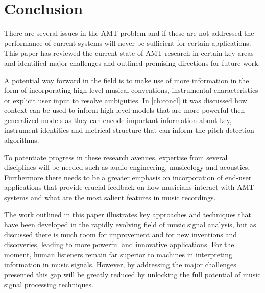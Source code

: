 \section{Conclusion}
There are several issues in the \ac{AMT} problem and if these are not addressed the
performance of current systems will never be sufficient for certain
applications. This paper has reviewed the current state of \ac{AMT} research in
certain key areas and identified major challenges and outlined promising
directions for future work.

A potential way forward in the field is to make use of more information in the
form of incorporating high-level musical conventions, instrumental
characteristics or explicit user input to resolve ambiguties. In
\autoref{ch:concl} it was discussed how context can be used to inform high-level models
that are more powerful then generalized models as they can encode important
information about key, instrument identities and metrical structure that can
inform the pitch detection algorithms.

To potentiate progress in these research avenues, expertise from several
disciplines will be needed such as audio engineering, musicology and acoustics.
Furthermore there needs to be a greater emphasis on incorporation of end-user
applications that provide crucial feedback on how musicians interact with \ac{AMT}
systems and what are the most salient features in music recordings.

The work outlined in this paper illustrates key approaches and techniques that
have been developed in the rapidly evolving field of music signal analysis, but
as discussed there is much room for improvement and for new inventions and
discoveries, leading to more powerful and innovative applications. For the
moment, human listeners remain far superior to machines in interpreting
information in music signals. However, by addressing the major challenges
presented this gap will be greatly reduced by unlocking the full potential of
music signal processing techniques.

